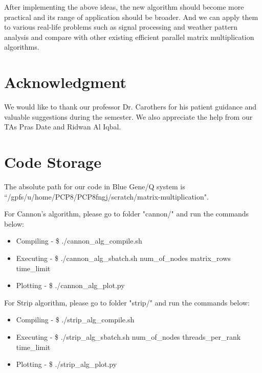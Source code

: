 \documentclass[conference]{IEEEtran}
\begin{document}
After implementing the above ideas, the new algorithm should become more practical and its range of application should be broader. And we can apply them to various real-life problems such as signal processing and weather pattern analysis \cite{b1} and compare with other existing efficient parallel matrix multiplication algorithms.

\section*{Acknowledgment}
We would like to thank our professor Dr. Carothers for his patient guidance and valuable suggestions during the semester. We also appreciate the help from our TAs Pras Date and Ridwan Al Iqbal.

\section*{Code Storage}
The absolute path for our code in Blue Gene/Q system is ``/gpfs/u/home/PCP8/PCP8fngj/scratch/matrix-multiplication". 

For Cannon's algorithm, please go to folder "cannon/" and run the commands below:
\begin{itemize}
    \item Compiling - \$ ./cannon\_alg\_compile.sh
    \item Executing - \$ ./cannon\_alg\_sbatch.sh num\_of\_nodes matrix\_rows time\_limit
    \item Plotting - \$ ./cannon\_alg\_plot.py
\end{itemize}

For Strip algorithm, please go to folder "strip/" and run the commands below:
\begin{itemize}
    \item Compiling - \$ ./strip\_alg\_compile.sh
    \item Executing - \$ ./strip\_alg\_sbatch.sh num\_of\_nodes threads\_per\_rank time\_limit
    \item Plotting - \$ ./strip\_alg\_plot.py
\end{itemize}
\end{document}
